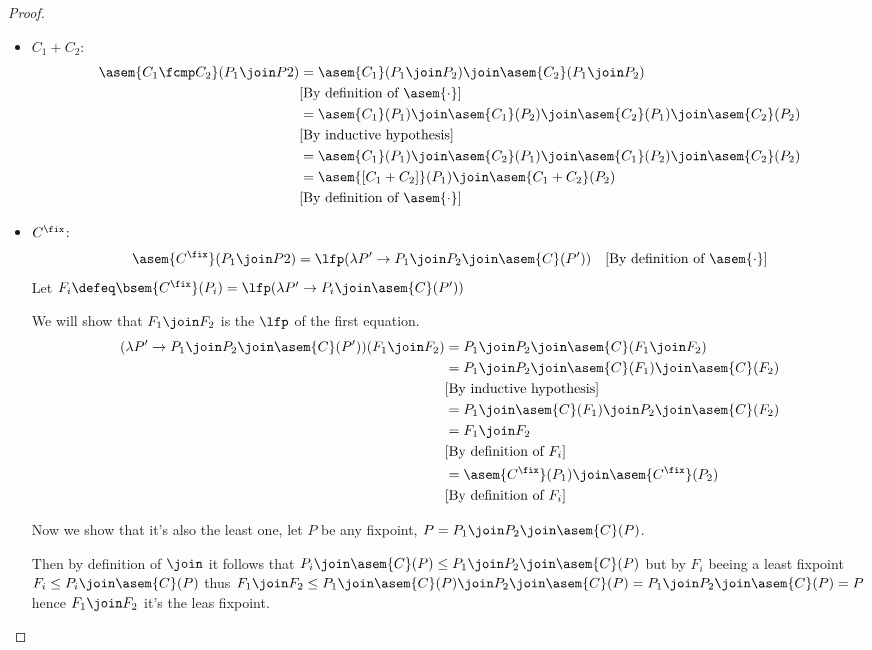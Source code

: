 \begin{proof}
\begin{itemize}
    \item $C_1 + C_2$:
      \begin{align*}
        \asem{C_1 \fcmp C_2}(P_1 \join P2)
          &= \asem{C_1}(P_1 \join P_2) \join \asem{C_2}(P_1 \join P_2) \\
          &\text{[By definition of $\asem{\cdot}$]} \\
          &= \asem{C_1}(P_1) \join \asem{C_1}(P_2) \join \asem{C_2}(P_1)
            \join \asem{C_2}(P_2) \\
          &\text{[By inductive hypothesis]} \\
          &= \asem{C_1}(P_1) \join \asem{C_2}(P_1) \join \asem{C_1}(P_2)
            \join \asem{C_2}(P_2) \\
          &= \asem{[C_1 + C_2]}(P_1) \join \asem{C_1 + C_2}(P_2) \\
          &\text{[By definition of $\asem{\cdot}$]} \\
      \end{align*}
    \item $C^\fix$:
      \begin{align*}
        \asem{C^\fix}(P_1 \join P2)
          &= \lfp(\lambda P' \to P_1 \join P_2 \join \asem{C}(P'))
          &\text{[By definition of $\asem{\cdot}$]}
      \end{align*}
      Let $F_i \defeq \bsem{C^\fix}(P_i) = \lfp(\lambda P' \to P_i \join 
      \asem{C}(P'))$

      We will show that $F_1 \join F_2$ is the $\lfp$ of the first equation.
      \begin{align*}
        (\lambda P' \to P_1 \join P_2 \join \asem{C}(P'))(F_1 \join F_2)
          &= P_1 \join P_2 \join \asem{C}(F_1 \join F_2) \\
          &= P_1 \join P_2 \join \asem{C}(F_1) \join \asem{C}(F_2)  \\
          &\text{[By inductive hypothesis]}\\
          &= P_1 \join \asem{C}(F_1) \join P_2 \join \asem{C}(F_2) \\
          &= F_1 \join F_2 \\
          &\text{[By definition of $F_i$]}\\
          &= \asem{C^\fix}(P_1) \join \asem{C^\fix}(P_2) \\
          &\text{[By definition of $F_i$]}\\
      \end{align*}

      Now we show that it's also the least one, let $P$ be any fixpoint, 
      $P = P_1 \join P_2 \join \asem{C}(P)$.
      
      Then by definition of $\join$ it follows that $P_i \join \asem{C}(P) \leq 
      P_1 \join P_2 \join \asem{C}(P)$ but by $F_i$ beeing a least fixpoint
      $F_i \leq P_i \join \asem{C}(P)$ thus $F_1 \join F_2 \leq P_1
      \join \asem{C}(P) \join P_2 \join \asem{C}(P) = P_1 \join P_2 \join 
      \asem{C}(P) = P$ hence $F_1 \join F_2$ it's the leas fixpoint.
  \end{itemize}
\end{proof}

